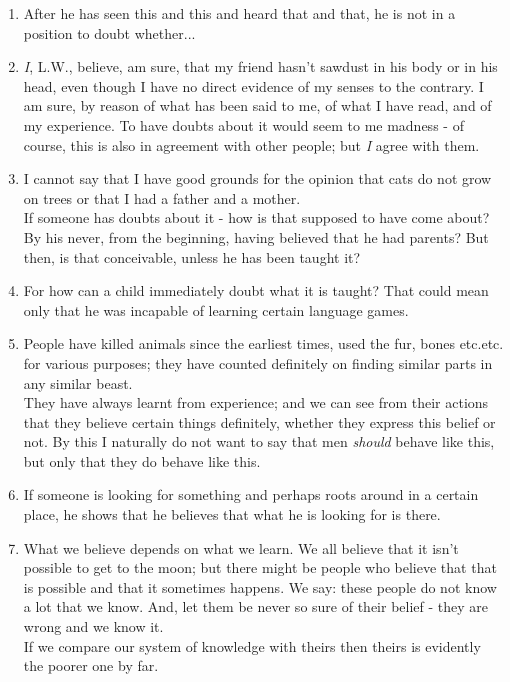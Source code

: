 \documentclass{book}
\begin{document}
\begin{enumerate}
\item
After he has seen this and this and heard that and that, he is not in a
position to doubt whether...

\item
\emph{I}, L.W., believe, am sure, that my friend hasn't sawdust in his body or
in his head, even though I have no direct evidence of my senses to the
contrary. I am sure, by reason of what has been said to me, of what I have
read, and of my experience. To have doubts about it would seem to me madness -
of course, this is also in agreement with other people; but \emph{I} agree with
them.

\item
I cannot say that I have good grounds for the opinion that cats do not grow on
trees or that I had a father and a mother. \\
If someone has doubts about it - how is that supposed to have come about? By
his never, from the beginning, having believed that he had parents? But then,
is that conceivable, unless he has been taught it?

\item
For how can a child immediately doubt what it is taught? That could mean only
that he was incapable of learning certain language games.

\item
People have killed animals since the earliest times, used the fur, bones
etc.etc. for various purposes; they have counted definitely on finding similar
parts in any similar beast. \\
They have always learnt from experience; and we can see from their actions that
they believe certain things definitely, whether they express this belief or
not. By this I naturally do not want to say that men \emph{should} behave like
this, but only that they do behave like this.

\item
If someone is looking for something and perhaps roots around in a certain
place, he shows that he believes that what he is looking for is there.

\item
What we believe depends on what we learn. We all believe that it isn't possible
to get to the moon; but there might be people who believe that that is possible
and that it sometimes happens. We say: these people do not know a lot that we
know. And, let them be never so sure of their belief - they are wrong and we
know it. \\
If we compare our system of knowledge with theirs then theirs is evidently the
poorer one by far.


\end{enumerate}
\end{document}
